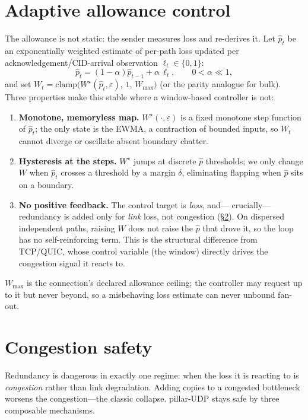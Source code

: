 \documentclass[10pt,twocolumn]{article}
\newcommand{\Wstar}{W^{\star}}
\begin{document}
\section{Adaptive allowance control}\label{sec:control}
The allowance is not static: the sender measures loss and re-derives it. Let
$\hat p_t$ be an exponentially weighted estimate of per-path loss updated per
acknowledgement/CID-arrival observation $\ell_t\in\{0,1\}$:
\begin{equation}
  \hat p_t=(1-\alpha)\hat p_{t-1}+\alpha\,\ell_t,\qquad 0<\alpha\ll1,
\end{equation}
and set $W_t=\mathrm{clamp}\big(\Wstar(\hat p_t,\varepsilon),\,1,\,W_{\max}\big)$
(or the parity analogue for bulk). Three properties make this stable where a
window-based controller is not:
\begin{enumerate}\itemsep2pt
  \item \textbf{Monotone, memoryless map.} $\Wstar(\cdot,\varepsilon)$ is a fixed
  monotone step function of $\hat p_t$; the only state is the EWMA, a contraction
  of bounded inputs, so $W_t$ cannot diverge or oscillate absent boundary
  chatter.
  \item \textbf{Hysteresis at the steps.} $\Wstar$ jumps at discrete $\hat p$
  thresholds; we only change $W$ when $\hat p_t$ crosses a threshold by a margin
  $\delta$, eliminating flapping when $\hat p$ sits on a boundary.
  \item \textbf{No positive feedback.} The control target is \emph{loss}, and---
  crucially---redundancy is added only for \emph{link} loss, not congestion
  (\S\ref{sec:safety}). On dispersed independent paths, raising $W$ does not raise
  the $\hat p$ that drove it, so the loop has no self-reinforcing term. This is
  the structural difference from TCP/QUIC, whose control variable (the window)
  directly drives the congestion signal it reacts to.
\end{enumerate}
$W_{\max}$ is the connection's declared allowance ceiling; the controller may
request up to it but never beyond, so a misbehaving loss estimate can never
unbound fan-out.

\section{Congestion safety}\label{sec:safety}
Redundancy is dangerous in exactly one regime: when the loss it is reacting to is
\emph{congestion} rather than link degradation. Adding copies to a congested
bottleneck worsens the congestion---the classic collapse. pillar-UDP stays safe
by three composable mechanisms.
\end{document}
